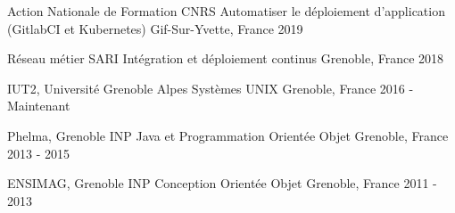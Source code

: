 

\begin{cventries}

  \cventrynodescr
    {Action Nationale de Formation CNRS} %
    {Automatiser le déploiement d'application (GitlabCI et Kubernetes)} %
    {Gif-Sur-Yvette, France} %
    {2019} %

  \cventrynodescr
    {Réseau métier SARI} %
    {Intégration et déploiement continus} %
    {Grenoble, France} %
    {2018} %

  \cventrynodescr
    {IUT2, Université Grenoble Alpes} %
    {Systèmes UNIX} %
    {Grenoble, France} %
    {2016 - Maintenant} %

  \cventrynodescr
    {Phelma, Grenoble INP} %
    {Java et Programmation Orientée Objet} %
    {Grenoble, France} %
    {2013 - 2015} %

  \cventrynodescr
    {ENSIMAG, Grenoble INP} %
    {Conception Orientée Objet} %
    {Grenoble, France} %
    {2011 - 2013} %
    
\end{cventries}
